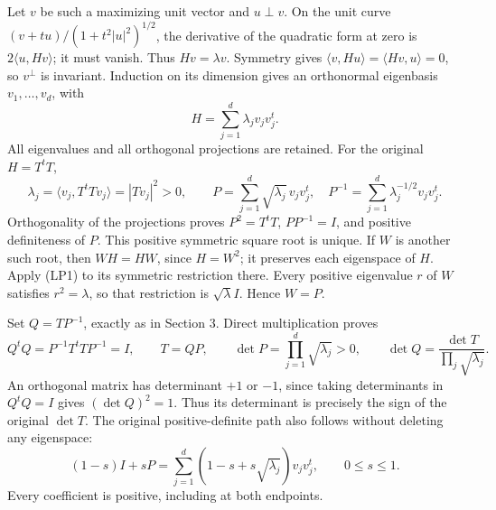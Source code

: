 \documentclass[
  11pt,
]{article}
\begin{document}
Let \(v\) be such a maximizing unit vector and \(u\perp v\). On the unit
curve \((v+tu)/(1+t^2|u|^2)^{1/2}\), the derivative of the quadratic
form at zero is \(2\langle u,Hv\rangle\); it must vanish. Thus
\(Hv=\lambda v\). Symmetry gives
\(\langle v,Hu\rangle=\langle Hv,u\rangle=0\), so \(v^\perp\) is
invariant. Induction on its dimension gives an orthonormal eigenbasis
\(v_1,\ldots,v_d\), with \[
 H=\sum_{j=1}^d\lambda_j v_jv_j^t.
 \tag{LP1}
\] All eigenvalues and all orthogonal projections are retained. For the
original \(H=T^tT\), \[
 \lambda_j=\langle v_j,T^tTv_j\rangle=|Tv_j|^2>0,
 \qquad
 P=\sum_{j=1}^d\sqrt{\lambda_j}\,v_jv_j^t,
 \quad
 P^{-1}=\sum_{j=1}^d\lambda_j^{-1/2}v_jv_j^t.
 \tag{LP2}
\] Orthogonality of the projections proves \(P^2=T^tT\), \(PP^{-1}=I\),
and positive definiteness of \(P\). This positive symmetric square root
is unique. If \(W\) is another such root, then \(WH=HW\), since
\(H=W^2\); it preserves each eigenspace of \(H\). Apply (LP1) to its
symmetric restriction there. Every positive eigenvalue \(r\) of \(W\)
satisfies \(r^2=\lambda\), so that restriction is \(\sqrt\lambda I\).
Hence \(W=P\).

Set \(Q=TP^{-1}\), exactly as in Section 3. Direct multiplication proves
\[
 Q^tQ=P^{-1}T^tTP^{-1}=I,
 \qquad T=QP,
 \qquad
 \det P=\prod_{j=1}^d\sqrt{\lambda_j}>0,
 \qquad\det Q=\frac{\det T}{\prod_j\sqrt{\lambda_j}}.
 \tag{LP3}
\] An orthogonal matrix has determinant \(+1\) or \(-1\), since taking
determinants in \(Q^tQ=I\) gives \((\det Q)^2=1\). Thus its determinant
is precisely the sign of the original \(\det T\). The original
positive-definite path also follows without deleting any eigenspace: \[
 (1-s)I+sP
       =\sum_{j=1}^d(1-s+s\sqrt{\lambda_j})v_jv_j^t,
 \qquad 0\le s\le1.
 \tag{LP4}
\] Every coefficient is positive, including at both endpoints.
\end{document}
